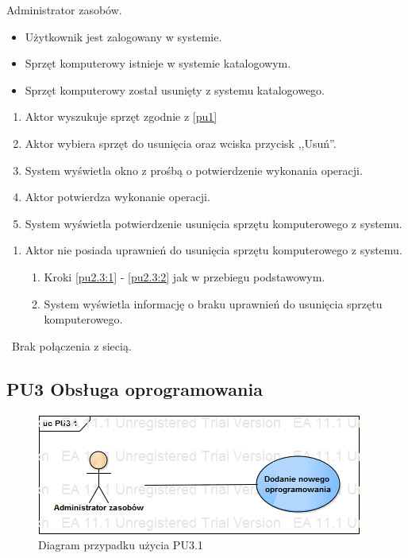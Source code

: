 Administrator zasobów.

\begin{itemize}
\item Użytkownik jest zalogowany w systemie.
\item Sprzęt komputerowy istnieje w systemie katalogowym.
\end{itemize}

\begin{itemize}
\item Sprzęt komputerowy został usunięty z systemu katalogowego.
\end{itemize}

\begin{enumerate}
\item \label{pu2.3:1} Aktor wyszukuje sprzęt zgodnie z \ref{pu1}
\item \label{pu2.3:2} Aktor wybiera sprzęt do usunięcia oraz wciska przycisk ,,Usuń''.
\item System wyświetla okno z prośbą o potwierdzenie wykonania operacji.
\item Aktor potwierdza wykonanie operacji.
\item System wyświetla potwierdzenie usunięcia sprzętu komputerowego z systemu.
\end{enumerate}

\begin{enumerate}
\item Aktor nie posiada uprawnień do usunięcia sprzętu komputerowego z systemu.
	\begin{enumerate}[label*=\arabic*.]
		\item Kroki \ref{pu2.3:1} - \ref{pu2.3:2} jak w przebiegu podstawowym.
		\item System wyświetla informację o braku uprawnień do usunięcia sprzętu komputerowego.
	\end{enumerate}
\end{enumerate}

\
Brak połączenia z siecią.

\subsection{PU3 Obsługa oprogramowania} \label{pu3}

\begin{figure}[h!]
	\centering
	\includegraphics[scale=0.6]{img/diagrams/useCaseDiagrams/PU3_1.png}
	\caption{Diagram przypadku użycia PU3.1 \label{fig:labelUCPU3.1}}
\end{figure}

